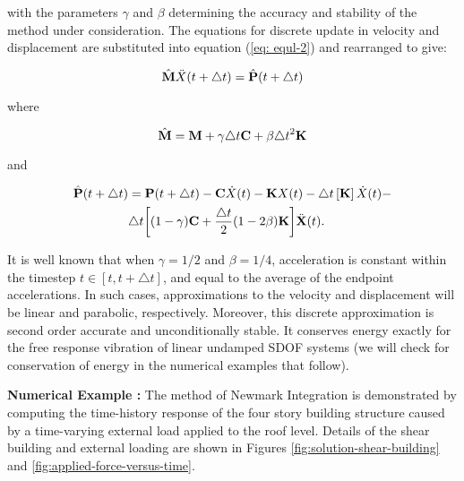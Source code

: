 \vspace{0.10 in}\noindent
with the parameters $\gamma$ and $\beta$ determining the accuracy and stability
of the method under consideration.
The equations for discrete update in velocity and displacement are
substituted into equation (\ref{eq: equl-2}) and rearranged to give:

\begin{equation}
\hat{\bf M} \ddot{X}(t+\triangle t) = \hat{\bf P}{(t + \triangle t)}
\label{eq: equl3}
\end{equation}

\vspace{0.05 in}\noindent
where

\begin{equation}
\hat{\bf M} = {\bf M} + \gamma {\triangle t} {\bf C} + \beta {\triangle t}^2 {\bf K}
\label{eq: equl4}
\end{equation}

\vspace{0.05 in}\noindent
and

\begin{eqnarray}
\hat{\bf P}{(t + \triangle t)} &= {\bf P}{(t + \triangle t)} - {\bf C} \dot{X}(t) - {\bf K} {X}(t) -
{\triangle t} \left[ {\bf K} \right]  \dot{X}(t) - \nonumber \\
& {\triangle t}
{\left[ (1- \gamma) {\bf C} + {{\triangle t} \over 2} (1 - 2 \beta) {\bf K} \right]} \ddot{\bf X}(t).  
\end{eqnarray}

\vspace{0.15 in}\noindent
It is well known that when $\gamma = 1/2$ and $\beta=1/4$,
acceleration is constant within the timestep $t \in \left[ t, {t+\triangle t} \right]$,
and equal to the average of the endpoint accelerations.
In such cases, approximations to the velocity and displacement
will be linear and parabolic, respectively.
Moreover, this discrete approximation is second order accurate and unconditionally stable.
It conserves energy exactly for the free response vibration of linear undamped SDOF
systems (we will check for conservation of energy in the numerical examples that follow).

\vspace{0.25 in}\noindent
{\bf Numerical Example :}
The method of Newmark Integration is demonstrated by computing the
time-history response of the four story building structure caused by a
time-varying external load applied to the roof level.
Details of the shear building and external loading are shown in
Figures \ref{fig:solution-shear-building} and \ref{fig:applied-force-versus-time}.

